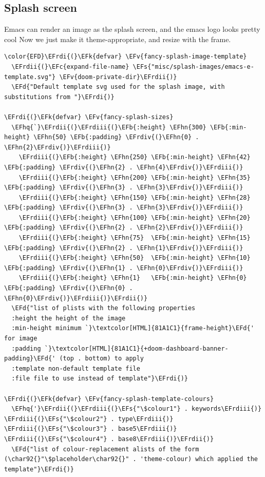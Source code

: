\documentclass{scrartcl}
\newcommand{\EFk}[1]{\textcolor{EFk}{#1}} %
\newcommand{\EFd}[1]{\textcolor{EFd}{#1}} %
\newcommand{\EFs}[1]{\textcolor{EFs}{#1}} %
\newcommand{\EFb}[1]{\textcolor{EFb}{#1}} %
\newcommand{\EFc}[1]{\textcolor{EFc}{#1}} %
\newcommand{\EFv}[1]{\textcolor{EFv}{#1}} %
\newcommand{\EFhn}[1]{#1} %
\newcommand{\EFhq}[1]{#1} %
\newcommand{\EFrdi}[1]{#1} %
\newcommand{\EFrdii}[1]{#1} %
\newcommand{\EFrdiii}[1]{#1} %
\newcommand{\EFrdiv}[1]{#1} %
\begin{document}
\subsection{Splash screen}
\label{sec:org298bec9}
Emacs can render an image as the splash screen, and the emacs logo looks pretty cool
Now we just make it theme-appropriate, and resize with the frame.
\begin{Code}
\begin{Verbatim}[]
\color{EFD}\EFrdi{(}\EFk{defvar} \EFv{fancy-splash-image-template}
  \EFrdii{(}\EFc{expand-file-name} \EFs{"misc/splash-images/emacs-e-template.svg"} \EFv{doom-private-dir}\EFrdii{)}
  \EFd{"Default template svg used for the splash image, with substitutions from "}\EFrdi{)}

\EFrdi{(}\EFk{defvar} \EFv{fancy-splash-sizes}
  \EFhq{`}\EFrdii{(}\EFrdiii{(}\EFb{:height} \EFhn{300} \EFb{:min-height} \EFhn{50} \EFb{:padding} \EFrdiv{(}\EFhn{0} . \EFhn{2}\EFrdiv{)}\EFrdiii{)}
    \EFrdiii{(}\EFb{:height} \EFhn{250} \EFb{:min-height} \EFhn{42} \EFb{:padding} \EFrdiv{(}\EFhn{2} . \EFhn{4}\EFrdiv{)}\EFrdiii{)}
    \EFrdiii{(}\EFb{:height} \EFhn{200} \EFb{:min-height} \EFhn{35} \EFb{:padding} \EFrdiv{(}\EFhn{3} . \EFhn{3}\EFrdiv{)}\EFrdiii{)}
    \EFrdiii{(}\EFb{:height} \EFhn{150} \EFb{:min-height} \EFhn{28} \EFb{:padding} \EFrdiv{(}\EFhn{3} . \EFhn{3}\EFrdiv{)}\EFrdiii{)}
    \EFrdiii{(}\EFb{:height} \EFhn{100} \EFb{:min-height} \EFhn{20} \EFb{:padding} \EFrdiv{(}\EFhn{2} . \EFhn{2}\EFrdiv{)}\EFrdiii{)}
    \EFrdiii{(}\EFb{:height} \EFhn{75}  \EFb{:min-height} \EFhn{15} \EFb{:padding} \EFrdiv{(}\EFhn{2} . \EFhn{1}\EFrdiv{)}\EFrdiii{)}
    \EFrdiii{(}\EFb{:height} \EFhn{50}  \EFb{:min-height} \EFhn{10} \EFb{:padding} \EFrdiv{(}\EFhn{1} . \EFhn{0}\EFrdiv{)}\EFrdiii{)}
    \EFrdiii{(}\EFb{:height} \EFhn{1}   \EFb{:min-height} \EFhn{0}  \EFb{:padding} \EFrdiv{(}\EFhn{0} . \EFhn{0}\EFrdiv{)}\EFrdiii{)}\EFrdii{)}
  \EFd{"list of plists with the following properties
  :height the height of the image
  :min-height minimum `}\textcolor[HTML]{81A1C1}{frame-height}\EFd{' for image
  :padding `}\textcolor[HTML]{81A1C1}{+doom-dashboard-banner-padding}\EFd{' (top . bottom) to apply
  :template non-default template file
  :file file to use instead of template"}\EFrdi{)}

\EFrdi{(}\EFk{defvar} \EFv{fancy-splash-template-colours}
  \EFhq{'}\EFrdii{(}\EFrdiii{(}\EFs{"\$colour1"} . keywords\EFrdiii{)} \EFrdiii{(}\EFs{"\$colour2"} . type\EFrdiii{)} \EFrdiii{(}\EFs{"\$colour3"} . base5\EFrdiii{)} \EFrdiii{(}\EFs{"\$colour4"} . base8\EFrdiii{)}\EFrdii{)}
  \EFd{"list of colour-replacement alists of the form (\char92{}"\$placeholder\char92{}" . 'theme-colour) which applied the template"}\EFrdi{)}


\end{Verbatim}
\end{Code}
\end{document}
